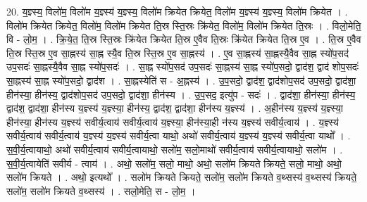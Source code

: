 \documentclass[17pt]{extarticle}
\begin{document}
20. य॒ज्ञ्स्य॒ विलो॑म॒ विलो॑म य॒ज्ञ्स्य॑ य॒ज्ञ्स्य॒ विलो॑म क्रियेत क्रियेत॒ विलो॑म य॒ज्ञ्स्य॑ य॒ज्ञ्स्य॒ विलो॑म क्रियेत । . विलो॑म क्रियेत क्रियेत॒ विलो॑म॒ विलो॑म क्रियेत ति॒स्र स्ति॒स्रः क्रि॑येत॒ विलो॑म॒ विलो॑म क्रियेत ति॒स्रः । . विलो॒मेति॒ वि - लो॒म॒ । . क्रि॒ये॒त॒ ति॒स्र स्ति॒स्रः क्रि॑येत क्रियेत ति॒स्र ए॒वैव ति॒स्रः क्रि॑येत क्रियेत ति॒स्र ए॒व । . ति॒स्र ए॒वैव ति॒स्र स्ति॒स्र ए॒व सा॒ह्नस्य॑ सा॒ह्न स्यै॒व ति॒स्र स्ति॒स्र ए॒व सा॒ह्नस्य॑ । . ए॒व सा॒ह्नस्य॑ सा॒ह्नस्यै॒वैव सा॒ह्न स्यो॑प॒सद॑ उप॒सदः॑ सा॒ह्नस्यै॒वैव सा॒ह्न स्यो॑प॒सदः॑ । . सा॒ह्न स्यो॑प॒सद॑ उप॒सदः॑ सा॒ह्नस्य॑ सा॒ह्न स्यो॑प॒सदो॒ द्वाद॑श॒ द्वाद॑ शोप॒सदः॑ सा॒ह्नस्य॑ सा॒ह्न स्यो॑प॒सदो॒ द्वाद॑श । . सा॒ह्नस्येति॑ स - अ॒ह्नस्य॑ । . उ॒प॒सदो॒ द्वाद॑श॒ द्वाद॑शोप॒सद॑ उप॒सदो॒ द्वाद॑शा॒ हीन॑स्या॒ हीन॑स्य॒ द्वाद॑शोप॒सद॑ उप॒सदो॒ द्वाद॑शा॒ हीन॑स्य । . उ॒प॒सद॒ इत्यु॑प - सदः॑ । . द्वाद॑शा॒ हीन॑स्या॒ हीन॑स्य॒ द्वाद॑श॒ द्वाद॑शा॒ हीन॑स्य य॒ज्ञ्स्य॑ य॒ज्ञ्स्या॒ हीन॑स्य॒ द्वाद॑श॒ द्वाद॑शा॒ हीन॑स्य य॒ज्ञ्स्य॑ । . अ॒हीन॑स्य य॒ज्ञ्स्य॑ य॒ज्ञ्स्या॒ हीन॑स्या॒ हीन॑स्य य॒ज्ञ्स्य॑ सवीर्य॒त्वाय॑ सवीर्य॒त्वाय॑ य॒ज्ञ्स्या॒
हीन॑स्या॒ही न॑स्य य॒ज्ञ्स्य॑ सवीर्य॒त्वाय॑ । . य॒ज्ञ्स्य॑ सवीर्य॒त्वाय॑ सवीर्य॒त्वाय॑ य॒ज्ञ्स्य॑ य॒ज्ञ्स्य॑ सवीर्य॒त्वा याथो॒ अथो॑ सवीर्य॒त्वाय॑ य॒ज्ञ्स्य॑ य॒ज्ञ्स्य॑ सवीर्य॒त्वा याथो᳚ । . स॒वी॒र्य॒त्वायाथो॒ अथो॑ सवीर्य॒त्वाय॑ सवीर्य॒त्वायाथो॒ सलो॑म॒ सलो॒माथो॑ सवीर्य॒त्वाय॑ सवीर्य॒त्वायाथो॒ सलो॑म । . स॒वी॒र्य॒त्वायेति॑ सवीर्य - त्वाय॑ । . अथो॒ सलो॑म॒ सलो॒ माथो॒ अथो॒ सलो॑म क्रियते क्रियते॒ सलो॒ माथो॒ अथो॒ सलो॑म क्रियते । . अथो॒ इत्यथो᳚ । . सलो॑म क्रियते क्रियते॒ सलो॑म॒ सलो॑म क्रियते व॒थ्सस्य॑ व॒थ्सस्य॑ क्रियते॒ सलो॑म॒ सलो॑म क्रियते व॒थ्सस्य॑ । . सलो॒मेति॒ स - लो॒म॒ । \newline
\end{document}
